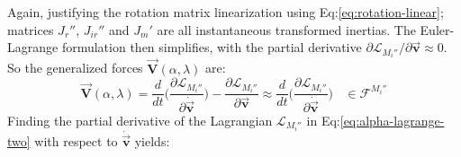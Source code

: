 Again, justifying the rotation matrix linearization using Eq:\ref{eq:rotation-linear}; matrices $J_r''$, $J_{ir}''$ and $J_m'$ are all instantaneous transformed inertias. The Euler-Lagrange formulation then simplifies, with the partial derivative $\partial\mathcal{L}_{M_i''}/\partial\vec{\mathbf{v}}\approx 0$. So the generalized forces $\vec{\mathbf{V}}(\alpha,\lambda)$ are:
\begin{equation}
\vec{\mathbf{V}}(\alpha,\lambda)=\frac{d}{dt}\Bigg(\frac{\partial\mathcal{L}_{M_i''}}{\partial\dot{\vec{\mathbf{v}}}}\Bigg)-\frac{\partial\mathcal{L}_{M_i''}}{\partial\vec{\mathbf{v}}}\approx\frac{d}{dt}\Bigg(\frac{\partial\mathcal{L}_{M_i''}}{\partial\dot{\vec{\mathbf{v}}}}\Bigg)~~~~\in\mathcal{F}^{M_i''}
\end{equation}
Finding the partial derivative of the Lagrangian $\mathcal{L}_{M_i''}$ in Eq:\ref{eq:alpha-lagrange-two} with respect to $\dot{\vec{\mathbf{v}}}$ yields:
